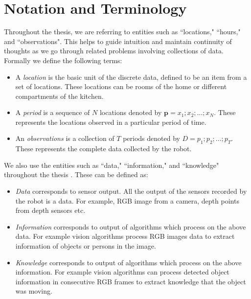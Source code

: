 \section{Notation and Terminology}
Throughout the thesis, we are referring to entities such as ``locations," ``hours," and ``observations".
This helps to guide intuition and maintain continuity of thoughts as we go through related problems involving collections of data.
Formally we define the following terms:
\begin{itemize}
	\item A \emph{location} is the basic unit of the discrete data, defined to be an item from a set of locations. These locations can be rooms of the home or different compartments of the kitchen. 
	\item A \emph{period} is a sequence of $N$ locations denoted by $\textbf{p} = {x_1;x_2; \dots ;x_N}$. These represents the locations observed in a particular period of time.
	\item An \emph{observations} is a collection of $T$ periods denoted by $ D = {p_1;p_2; \dots ;p_T}$. These represents the complete data collected by the robot.
\end{itemize}


We also use the entities such as ``data," ``information," and ``knowledge" throughout the thesis \cite{niemueller2012generic}. These can be defined as:
\begin{itemize}
	\item \emph{Data} corresponds to sensor output. All the output of the sensors recorded by the robot is a data. For example, RGB image from a camera, depth points from depth sensors etc.
	\item \emph{Information} corresponds to output of algorithms which process on the above data. For example vision algorithms process RGB images data to extract information of objects or persons in the image.
	\item \emph{Knowledge} corresponds to output of algorithms which process on the above information. For example vision algorithms can process detected object information in consecutive RGB frames to extract knowledge that the object was moving.
\end{itemize}

